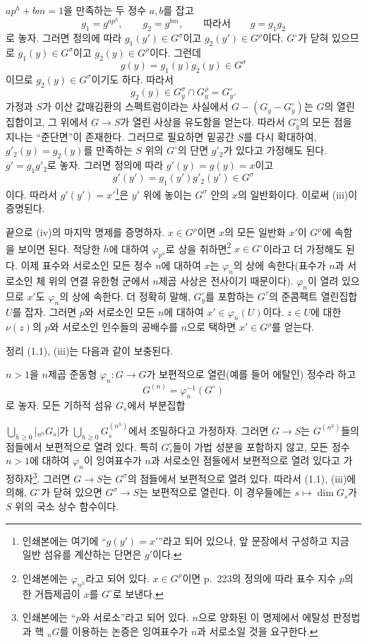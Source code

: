 $ap^h+bm=1$을 만족하는 두 정수 $a,b$를 잡고
\[
g_1=g^{ap^h},\qquad g_2=g^{bm},\qquad\text{따라서}\qquad g=g_1g_2
\]
로 놓자. 그러면 정의에 따라 $g_1(y')\in G^\sigma$이고
$g_2(y')\in G^\rho$이다. $G^\circ$가 닫혀 있으므로
$g_1(y)\in G^\sigma$이고 $g_2(y)\in G^\rho$이다. 그런데
\[
g(y)=g_1(y)g_2(y)\in G^\sigma
\]
이므로 $g_2(y)\in G^\sigma$이기도 하다. 따라서
\[
g_2(y)\in G_y^\sigma\cap G_y^\rho=G_y^\circ.
\]
가정과 $S$가 이산 값매김환의 스펙트럼이라는 사실에서
$G-(G_y-G_y^\circ)$는 $G$의 열린집합이고, 그 위에서
$G\longrightarrow S$가 열린 사상을 유도함을 얻는다. 따라서
$G_y^\circ$의 모든 점을 지나는 ``준단면''이 존재한다. 그러므로 필요하면
밑공간 $S$를 다시 확대하여, $g'_2(y)=g_2(y)$를 만족하는 $S$ 위의
$G^\circ$의 단면 $g'_2$가 있다고 가정해도 된다. $g'=g_1g'_2$로 놓자.
그러면 정의에 따라 $g'(y)=g(y)=x$이고
\[
g'(y')=g_1(y')g'_2(y')\in G^\sigma
\]
이다. 따라서 $g'(y')=x'$\footnote{인쇄본에는 여기에 ``$g(y')=x'$''라고
되어 있으나, 앞 문장에서 구성하고 지금 일반 섬유를 계산하는 단면은
$g'$이다.}은 $y'$ 위에 놓이는 $G^\sigma$ 안의 $x$의 일반화이다. 이로써
(iii)이 증명된다.

끝으로 (iv)의 마지막 명제를 증명하자. $x\in G^\rho$이면 $x$의 모든
일반화 $x'$이 $G^\rho$에 속함을 보이면 된다. 적당한 $h$에 대하여
$\varphi_{p^h}$로 상을 취하면\footnote{인쇄본에는 $\varphi_{n^h}$라고
되어 있다. $x\in G^\rho$이면 p.~223의 정의에 따라 표수 지수 $p$의 한
거듭제곱이 $x$를 $G^\circ$로 보낸다.} $x\in G^\circ$이라고 더 가정해도
된다. 이제 표수와 서로소인 모든 정수 $n$에 대하여 $x$는
$\varphi_n$의 상에 속한다(표수가 $n$과 서로소인 체 위의 연결 유한형
군에서 $n$제곱 사상은 전사이기 때문이다). $\varphi_n$이 열려 있으므로
$x'$도 $\varphi_n$의 상에 속한다. 더 정확히 말해, $G_y^\circ$를 포함하는
$G^\tau$의 준콤팩트 열린집합 $U$를 잡자. 그러면 $p$와 서로소인 모든
$n$에 대하여 $x'\in\varphi_n(U)$이다. $z\in U$에 대한 $\nu(z)$의
$p$와 서로소인 인수들의 공배수를 $n$으로 택하면 $x'\in G^\rho$를
얻는다.

정리 (1.1), (iii)는 다음과 같이 보충된다.

 $n>1$을 $n$제곱 준동형
$\varphi_n:G\longrightarrow G$가 보편적으로 열린(예를 들어 에탈인)
정수라 하고
\[
G^{(n)}=\varphi_n^{-1}(G^\circ)
\]
로 놓자. 모든 기하적 섬유 $G_{\bar s}$에서 부분집합

$\bigcup_{h\geq0}|{}_{n^h}G_{\bar s}|$가
$\bigcup_{h\geq0}G_{\bar s}^{(n^h)}$에서 조밀하다고 가정하자. 그러면
$G\longrightarrow S$는 $G^{(n^h)}$들의 점들에서 보편적으로 열려 있다.
특히 $G_s^\circ$들이 가법 성분을 포함하지 않고, 모든 정수 $n>1$에
대하여 $\varphi_n$이 잉여표수가 $n$과 서로소인 점들에서 보편적으로
열려 있다고 가정하자\footnote{인쇄본에는 ``$p$와 서로소''라고 되어 있다.
$n$으로 양화된 이 명제에서 에탈성 판정법과 핵 ${}_nG$를 이용하는 논증은
잉여표수가 $n$과 서로소일 것을 요구한다.}. 그러면
$G\longrightarrow S$는 $G^\sigma$의 점들에서 보편적으로 열려 있다.
따라서 (1.1), (iii)에 의해, $G^\circ$가 닫혀 있으면
$G^\sigma\longrightarrow S$는 보편적으로 열린다. 이 경우들에는
$s\longmapsto\dim G_s$가 $S$ 위의 국소 상수 함수이다.

